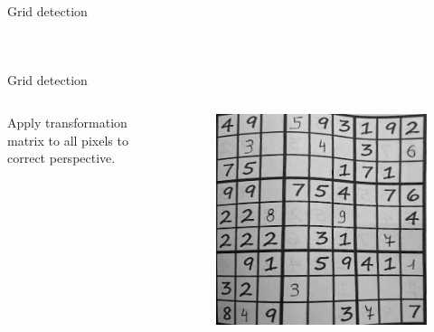 \documentclass[12pt, dvipsnames]{beamer}
\begin{document}
\begin{frame}{Grid detection}
\begin{columns}
\begin{figure}
        \end{figure}
    \end{columns}
\end{frame}

\begin{frame}{Grid detection}
    \begin{columns}
        Apply transformation matrix to all pixels to correct \alert{perspective}.
        \begin{figure}
            \centering
            \includegraphics[width=1\textwidth]{resources/sudoku/sudoku_0025_03.jpg}
        \end{figure}
    \end{columns}
\end{frame}
\end{document}
